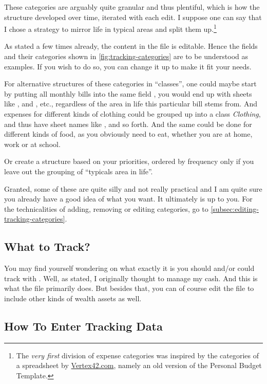 These categories are arguably quite granular and thus plentiful, which is how the structure developed over time, iterated with each edit.
I suppose one can say that I chose a strategy to mirror life in typical areas and split them up.\footnote{The \emph{very first} division of expense categories was inspired by the categories of a spreadsheet by \href{https://www.vertex42.com/}{Vertex42.com}, namely an old version of the Personal Budget Template.}

As stated a few times already, the content in the file is editable.
Hence the fields and their categories shown in \autoref{fig:tracking-categories} are to be understood as examples.
If you wish to do so, you can change it up to make it fit your needs.

For alternative structures of these categories in ``classes'', one could maybe start by putting all monthly bills into the same field , \ie you would end up with sheets like ,  and , etc., regardless of the area in life this particular bill stems from.
And expenses for different kinds of clothing could be grouped up into a class \emph{Clothing}, and thus have sheet names like ,  and so forth.
And the same could be done for different kinds of food, as you obviously need to eat, whether you are at home, work or at school.

Or create a structure based on your priorities, ordered by frequency only if you leave out the grouping of ``typicals area in life''.

Granted, some of these are quite silly and not really practical and I am quite sure you already have a good idea of what you want.
It ultimately is up to you.
For the technicalities of adding, removing or editing categories, go to \autoref{subsec:editing-tracking-categories}.

\subsection{What to Track?}
\label{subsec:what-to-track}

You may find yourself wondering on what exactly it is you should and/or could track with \tfn.
Well, as stated, I originally thought to manage my cash.
And this is what the file primarily does.
But besides that, you can of course edit the file to include other kinds of wealth assets as well.

\subsection{How To Enter Tracking Data}
\label{subsec:enter-tracking-data}

